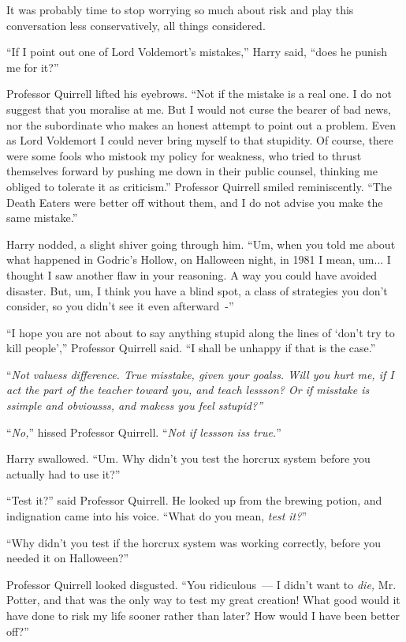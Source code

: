 It was probably time to stop worrying so much about risk and play this conversation less conservatively, all things considered.

``If I point out one of Lord Voldemort's mistakes,'' Harry said, ``does he punish me for it?''

Professor Quirrell lifted his eyebrows. ``Not if the mistake is a real one. I do not suggest that you moralise at me. But I would not curse the bearer of bad news, nor the subordinate who makes an honest attempt to point out a problem. Even as Lord Voldemort I could never bring myself to that stupidity. Of course, there were some fools who mistook my policy for weakness, who tried to thrust themselves forward by pushing me down in their public counsel, thinking me obliged to tolerate it as criticism.'' Professor Quirrell smiled reminiscently. ``The Death Eaters were better off without them, and I do not advise you make the same mistake.''

Harry nodded, a slight shiver going through him. ``Um, when you told me about what happened in Godric's Hollow, on Halloween night, in 1981 I mean, um... I thought I saw another flaw in your reasoning. A way you could have avoided disaster. But, um, I think you have a blind spot, a class of strategies you don't consider, so you didn't see it even afterward~-''

``I hope you are not about to say anything stupid along the lines of `don't try to kill people','' Professor Quirrell said. ``I shall be unhappy if that is the case.''

``\emph{Not valuess difference. True misstake, given your goalss. Will you hurt me, if I act the part of the teacher toward you, and teach lessson? Or if misstake is ssimple and obviousss, and makess you feel sstupid?''}

``\emph{No,}'' hissed Professor Quirrell. ``\emph{Not if lessson iss true.}''

Harry swallowed. ``Um. Why didn't you test the horcrux system before you actually had to use it?''

``Test it?'' said Professor Quirrell. He looked up from the brewing potion, and indignation came into his voice. ``What do you mean, \emph{test it?}''

``Why didn't you test if the horcrux system was working correctly, before you needed it on Halloween?''

Professor Quirrell looked disgusted. ``You ridiculous~--- I didn't want to \emph{die,} Mr. Potter, and that was the only way to test my great creation! What good would it have done to risk my life sooner rather than later? How would I have been better off?''

